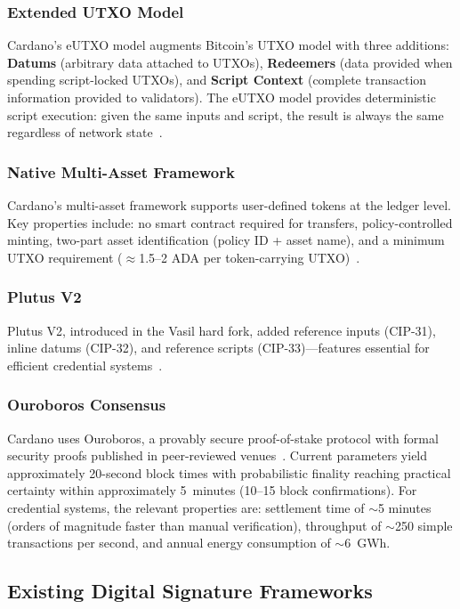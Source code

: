\documentclass[conference,10pt]{IEEEtran}
\begin{document}
\subsubsection{Extended UTXO Model} Cardano's eUTXO model augments Bitcoin's UTXO model with three additions: \textbf{Datums} (arbitrary data attached to UTXOs), \textbf{Redeemers} (data provided when spending script-locked UTXOs), and \textbf{Script Context} (complete transaction information provided to validators). The eUTXO model provides deterministic script execution: given the same inputs and script, the result is always the same regardless of network state~\cite{chakravarty2020}.

\subsubsection{Native Multi-Asset Framework} Cardano's multi-asset framework supports user-defined tokens at the ledger level. Key properties include: no smart contract required for transfers, policy-controlled minting, two-part asset identification (policy ID + asset name), and a minimum UTXO requirement ($\approx$1.5--2 ADA per token-carrying UTXO)~\cite{cip25}.

\subsubsection{Plutus V2} Plutus V2, introduced in the Vasil hard fork, added reference inputs (CIP-31), inline datums (CIP-32), and reference scripts (CIP-33)---features essential for efficient credential systems~\cite{cip31,cip32,cip33}.

\subsubsection{Ouroboros Consensus} Cardano uses Ouroboros, a provably secure proof-of-stake protocol with formal security proofs published in peer-reviewed venues~\cite{kiayias2017,badertscher2018}. Current parameters yield approximately 20-second block times with probabilistic finality reaching practical certainty within approximately 5~minutes (10--15 block confirmations). For credential systems, the relevant properties are: settlement time of $\sim$5 minutes (orders of magnitude faster than manual verification), throughput of $\sim$250 simple transactions per second, and annual energy consumption of $\sim$6~GWh.

\subsection{Existing Digital Signature Frameworks}
\end{document}
